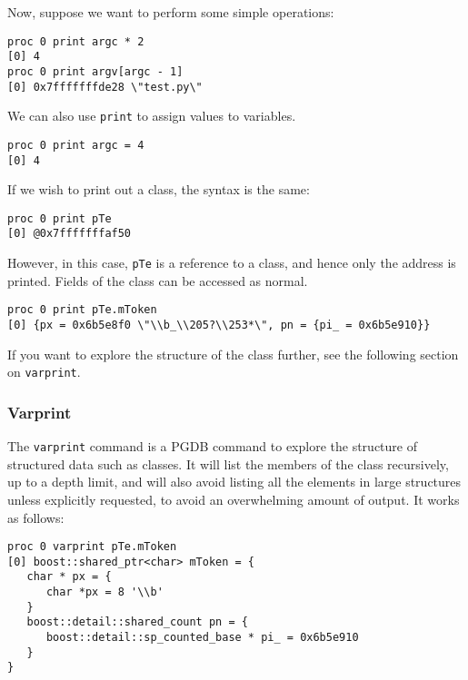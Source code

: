 \documentclass{refart}
\begin{document}
Now, suppose we want to perform some simple operations:

\begin{Verbatim}
proc 0 print argc * 2
[0] 4
proc 0 print argv[argc - 1]
[0] 0x7fffffffde28 \"test.py\"
\end{Verbatim}

We can also use \texttt{print} to assign values to variables.

\begin{Verbatim}
proc 0 print argc = 4
[0] 4
\end{Verbatim}

If we wish to print out a class, the syntax is the same:

\begin{Verbatim}
proc 0 print pTe
[0] @0x7fffffffaf50
\end{Verbatim}

However, in this case, \texttt{pTe} is a reference to a class, and hence only the address is printed. Fields of the class can be accessed as normal.

\begin{Verbatim}
proc 0 print pTe.mToken
[0] {px = 0x6b5e8f0 \"\\b_\\205?\\253*\", pn = {pi_ = 0x6b5e910}}
\end{Verbatim}

If you want to explore the structure of the class further, see the following section on \texttt{varprint}.

\subsubsection{Varprint}

The \texttt{varprint} command is a PGDB command to explore the structure of structured data such as classes. It will list the members of the class recursively, up to a depth limit, and will also avoid listing all the elements in large structures unless explicitly requested, to avoid an overwhelming amount of output. It works as follows:

\begin{Verbatim}
proc 0 varprint pTe.mToken
[0] boost::shared_ptr<char> mToken = {
   char * px = {
      char *px = 8 '\\b'
   }
   boost::detail::shared_count pn = {
      boost::detail::sp_counted_base * pi_ = 0x6b5e910
   }
}
\end{Verbatim}
\end{document}
